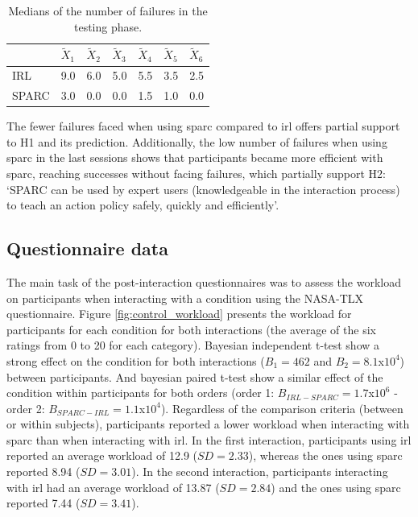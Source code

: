 \begin{table}[ht]
	\centering
	\caption{Medians of the number of failures in the testing phase.}
	\label{tab:control_failures}
	\begin{tabular}{@{}lllllll@{}}\toprule
		& $\widetilde{X}_{1}$ & $\widetilde{X}_{2}$ & $\widetilde{X}_{3}$ & $\widetilde{X}_{4}$ & $\widetilde{X}_{5}$ & $\widetilde{X}_{6}$\\ 
		\midrule
	    IRL & 9.0 & 6.0 & 5.0 & 5.5 & 3.5 & 2.5\\
	    SPARC & 3.0 & 0.0 & 0.0 & 1.5 & 1.0 & 0.0\\
	    \bottomrule
	\end{tabular}
\end{table}

The fewer failures faced when using \gls{sparc} compared to \gls{irl} offers partial support to H1 and its prediction. Additionally, the low number of failures when using \gls{sparc} in the last sessions shows that participants became more efficient with \gls{sparc}, reaching successes without facing failures, which partially support H2: `SPARC can be used by expert users (knowledgeable in the interaction process) to teach an action policy safely, quickly and efficiently'.

\subsection{Questionnaire data}

The main task of the post-interaction questionnaires was to assess the workload on participants when interacting with a condition using the NASA-TLX questionnaire. Figure \ref{fig:control_workload} presents the workload for participants for each condition for both interactions (the average of the six ratings from 0 to 20 for each category). Bayesian independent t-test show a strong effect on the condition for both interactions ($B_1=462$ and $B_2=8.1$x$10^4$) between participants. And bayesian paired t-test show a similar effect of the condition within participants for both orders (order 1: $B_{IRL-SPARC}=1.7$x$10^6$ - order 2: $B_{SPARC-IRL}=1.1$x$10^4$). Regardless of the comparison criteria (between or within subjects), participants reported a lower workload when interacting with \gls{sparc} than when interacting with \gls{irl}. In the first interaction, participants using \gls{irl} reported an average workload of 12.9 ($SD=2.33$), whereas the ones using \gls{sparc} reported 8.94 ($SD=3.01$). In the second interaction, participants interacting with \gls{irl} had an average workload of 13.87 ($SD=2.84$) and the ones using \gls{sparc} reported 7.44 ($SD=3.41$).

